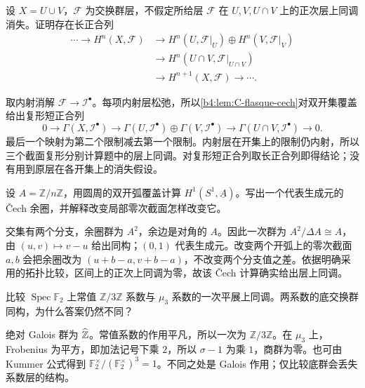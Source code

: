 \begin{exercise}\label{b4:ex:C-mayer-vietoris}
	设 \(X=U\cup V\)，\(\mathcal F\) 为交换群层，不假定所给层 \(\mathcal F\) 在 \(U,V,U\cap V\) 上的正次层上同调消失。证明存在长正合列
	\[
		\begin{aligned}
			\cdots\longrightarrow H^n(X,\mathcal F) &\longrightarrow H^n(U,\mathcal F|_U)\oplus H^n(V,\mathcal F|_V)\\
			&\longrightarrow H^n(U\cap V,\mathcal F|_{U\cap V})\\
			&\longrightarrow H^{n+1}(X,\mathcal F)\longrightarrow\cdots.
		\end{aligned}
	\]
\end{exercise}
\begin{solution}
	取内射消解 \(\mathcal F\rightarrow\mathcal I^\bullet\)。每项内射层松弛，所以\cref{b4:lem:C-flasque-cech}对双开集覆盖给出复形短正合列
	\[
		0\longrightarrow\Gamma(X,\mathcal I^\bullet) \longrightarrow\Gamma(U,\mathcal I^\bullet)\oplus\Gamma(V,\mathcal I^\bullet) \longrightarrow\Gamma(U\cap V,\mathcal I^\bullet)\longrightarrow0.
	\]
	最后一个映射为第二个限制减去第一个限制。内射层在开集上的限制仍内射，所以三个截面复形分别计算题中的层上同调。对复形短正合列取长正合列即得结论；没有用到原层在各开集上的消失假设。
\end{solution}

\begin{exercise}\label{b4:ex:C-circle-finite-coefficients}
	设 \(A=\mathbb Z/n\mathbb Z\)，用圆周的双开弧覆盖计算 \(H^1(S^1,\underline A)\)。写出一个代表生成元的 Čech 余圈，并解释改变局部零次截面怎样改变它。
\end{exercise}
\begin{solution}
	交集有两个分支，余圈群为 \(A^2\)，余边是对角的 \(A\)。因此一次群为 \(A^2/\Delta A\cong A\)，由 \((u,v)\mapsto v-u\) 给出同构；\((0,1)\) 代表生成元。改变两个开弧上的零次截面 \(a,b\) 会把余圈改为 \((u+b-a,v+b-a)\)，不改变两个分支值之差。依据明确采用的拓扑比较，区间上的正次上同调为零，故该 Čech 计算确实给出层上同调。
\end{solution}

\begin{exercise}\label{b4:ex:C-two-etale-coefficients}
	比较 \(\operatorname{Spec}\mathbb F_2\) 上常值 \(\mathbb Z/3\mathbb Z\) 系数与 \(\mu_3\) 系数的一次平展上同调。两系数的底交换群同构，为什么答案仍然不同？
\end{exercise}
\begin{solution}
	绝对 Galois 群为 \(\widehat{\vphantom{Z}\mathbb Z}\)。常值系数的作用平凡，所以一次为 \(\mathbb Z/3\mathbb Z\)。在 \(\mu_3\) 上，Frobenius 为平方，即加法记号下乘 \(2\)，所以 \(\sigma-1\) 为乘 \(1\)，商群为零。也可由 Kummer 公式得到 \(\mathbb F_2^\times/(\mathbb F_2^\times)^3=1\)。不同之处是 Galois 作用；仅比较底群会丢失系数层的结构。
\end{solution}

